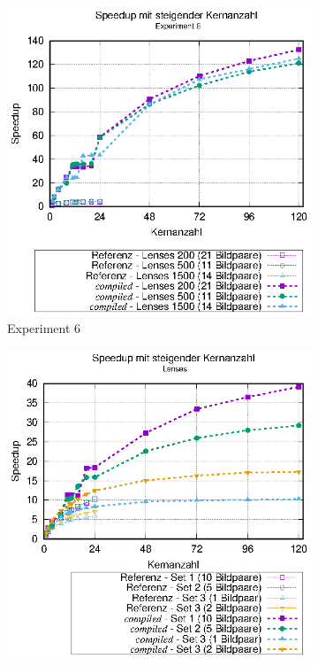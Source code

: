 \begin{center}
	\begin{figure}[htbp]
		\begin{subfigure}[b]{0.45\textwidth}
			\centering
			\includegraphics[width=\textwidth]{pdf/best_speedup_exp6}
			\caption{Experiment 6}
			\label{fig:best_speedup_exp6}
		\end{subfigure}
		\hfill
		\begin{subfigure}[b]{0.45\textwidth}
			\centering
			\includegraphics[width=\textwidth]{pdf/best_speedup_lenses}

\end{subfigure}
\end{figure}
\end{center}
